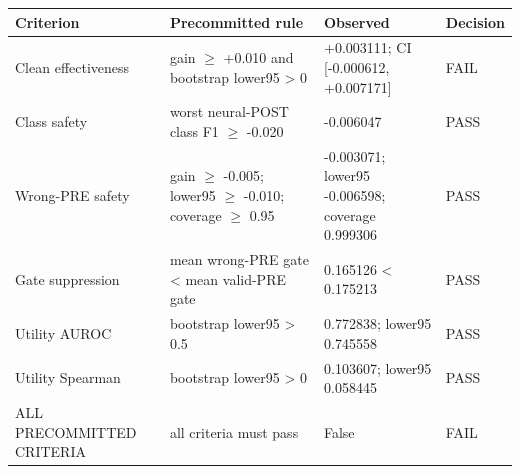 \begin{tabular}{llll}
\toprule
Criterion & Precommitted rule & Observed & Decision \\
\midrule
Clean effectiveness & gain \(\ge\) +0.010 and bootstrap lower95 > 0 & +0.003111; CI [-0.000612, +0.007171] & FAIL \\
Class safety & worst neural-POST class F1 \(\ge\) -0.020 & -0.006047 & PASS \\
Wrong-PRE safety & gain \(\ge\) -0.005; lower95 \(\ge\) -0.010; coverage \(\ge\) 0.95 & -0.003071; lower95 -0.006598; coverage 0.999306 & PASS \\
Gate suppression & mean wrong-PRE gate < mean valid-PRE gate & 0.165126 < 0.175213 & PASS \\
Utility AUROC & bootstrap lower95 > 0.5 & 0.772838; lower95 0.745558 & PASS \\
Utility Spearman & bootstrap lower95 > 0 & 0.103607; lower95 0.058445 & PASS \\
ALL PRECOMMITTED CRITERIA & all criteria must pass & False & FAIL \\
\bottomrule
\end{tabular}
